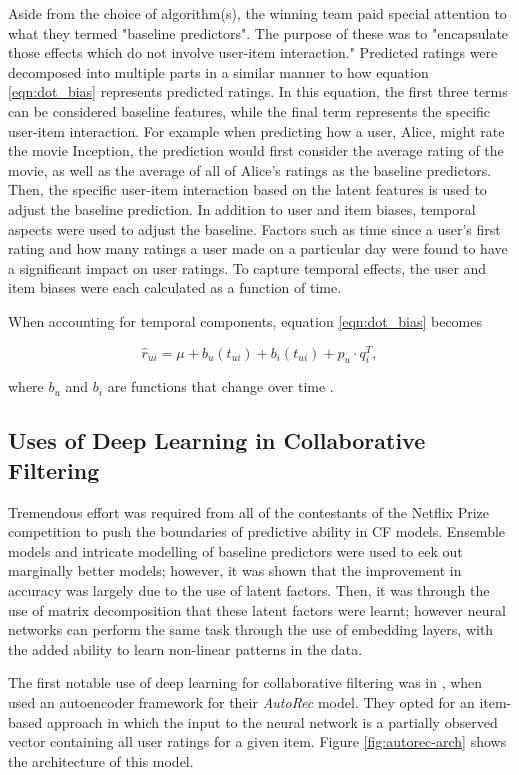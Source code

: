 Aside from the choice of algorithm(s), the winning team paid special attention to what they termed "baseline predictors". The purpose of these was to "encapsulate those effects which do not involve user-item interaction." Predicted ratings were decomposed into multiple parts in a similar manner to how equation \ref{eqn:dot_bias} represents predicted ratings. In this equation, the first three terms can be considered baseline features, while the final term represents the specific user-item interaction. For example when predicting how a user, Alice, might rate the movie Inception, the prediction would first consider the average rating of the movie, as well as the average of all of Alice's ratings as the baseline predictors. Then, the specific user-item interaction based on the latent features is used to adjust the baseline prediction. In addition to user and item biases, temporal aspects were used to adjust the baseline. Factors such as time since a user's first rating and how many ratings a user made on a particular day were found to have a significant impact on user ratings. To capture temporal effects, the user and item biases were each calculated as a function of time. 

When accounting for temporal components, equation \ref{eqn:dot_bias} becomes

\begin{equation}
    \hat{r}_{ui} = \mu + b_u(t_{ui}) + b_i(t_{ui}) + p_u \cdot q_i^{T},
\label{eqn:temp_baseline}
\end{equation}

where $b_u$ and $b_i$ are functions that change over time \parencite{netflix_bellkor}.

\subsection{Uses of Deep Learning in Collaborative Filtering}
Tremendous effort was required from all of the contestants of the Netflix Prize competition to push the boundaries of predictive ability in CF models. Ensemble models and intricate modelling of baseline predictors were used to eek out marginally better models; however, it was shown that the improvement in accuracy was largely due to the use of latent factors. Then, it was through the use of matrix decomposition that these latent factors were learnt; however neural networks can perform the same task through the use of embedding layers, with the added ability to learn non-linear patterns in the data.

The first notable use of deep learning for collaborative filtering was in \cite*{sedhain2015autorec}, when \citeauthor{sedhain2015autorec} used an autoencoder framework for their \textit{AutoRec} model. They opted for an item-based approach in which the input to the neural network is a partially observed vector containing all user ratings for a given item. Figure \ref{fig:autorec-arch} shows the architecture of this model.

